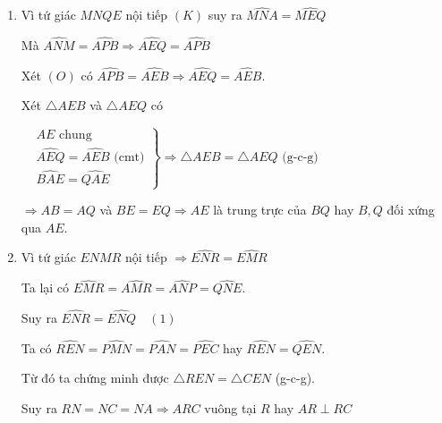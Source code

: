 \begin{ex}
{\begin{enumerate}
{
}
    \item Vì tứ giác $MNQE$ nội tiếp $(K)$ suy ra $\widehat{MNA} =\widehat{MEQ}$
    
    Mà $\widehat{ANM} = \widehat{APB}\Rightarrow \widehat{AEQ} = \widehat{APB}$
    
    Xét $(O)$ có $\widehat{APB} = \widehat{AEB}\Rightarrow \widehat{AEQ} = \widehat{AEB}$.
    
    Xét $\triangle AEB$ và $\triangle AEQ$ có 
    
    $
     \left.
        \begin{aligned}
        & AE \mbox{ chung}\\
        & \widehat{AEQ} = \widehat{AEB} \mbox{ (cmt)}\\
        & \widehat{BAE} = \widehat{QAE}
        \end{aligned} 
        \right\} \Rightarrow \triangle AEB  =\triangle AEQ \mbox{ (g-c-g)}$ 
        
        $\Rightarrow AB = AQ$ và $BE = EQ\Rightarrow AE$ là trung trực của $BQ$ hay $B, Q$ đối xứng qua $AE$.
    \item Vì tứ giác $ENMR$ nội tiếp $\Rightarrow \widehat{ENR} = \widehat{EMR}$ 
    
    Ta lại có $\widehat{EMR} = \widehat{AMR} = \widehat{ANP} = \widehat{QNE}$.
    
   	Suy ra $\widehat{ENR} = \widehat{ENQ} \quad (1)$ 
   
   Ta có $\widehat{REN} = \widehat{PMN} = \widehat{PAN} = \widehat{PEC}$ hay $\widehat{REN} = \widehat{QEN}$.
   
   Từ đó ta chứng minh được $\triangle REN = \triangle CEN$ (g-c-g).
   
   Suy ra $RN = NC = NA \Rightarrow ARC$ vuông tại $R$ hay $AR \perp RC$
    \end{enumerate}
    }
\end{ex}

